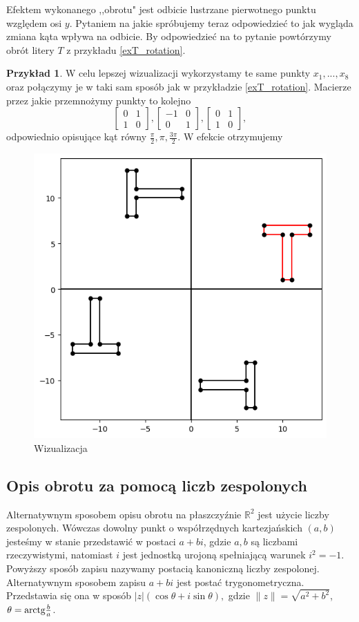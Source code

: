 \documentclass[a4paper,twoside,11pt,reqno]{mwrep}
\theoremstyle{plain} \newtheorem{twr}{Twierdzenie}
\theoremstyle{plain} \newtheorem{lem}{Lemat}
\theoremstyle{definition} \newtheorem{defi}{Definicja}
\theoremstyle{remark} \newtheorem*{wni}{Wniosek}
\theoremstyle{definition} \newtheorem{uwaga}{Uwaga}
\theoremstyle{definition}\newtheorem{prz}{Przykład}
\begin{document}
Efektem wykonanego ,,obrotu" jest odbicie lustrzane pierwotnego punktu względem osi $y$.
Pytaniem na jakie spróbujemy teraz odpowiedzieć to jak wygląda zmiana kąta wpływa na odbicie. 
By odpowiedzieć na to pytanie powtórzymy obrót litery $T$ z przykładu \ref{exT_rotation}.
\begin{prz}
W celu lepszej wizualizacji wykorzystamy te same punkty $x_1,...,x_8$ oraz połączymy je w taki sam sposób
jak w przykładzie  \ref{exT_rotation}. Macierze przez jakie przemnożymy punkty to kolejno
$$\begin{bmatrix}
0&1 \\
1&0 
\end{bmatrix},
\begin{bmatrix}
-1&0 \\
0&1 
\end{bmatrix},
\begin{bmatrix}
0&1 \\
1&0 
\end{bmatrix},
$$
odpowiednio opisujące kąt równy $\frac{\pi}{2},\pi,\frac{3\pi}{2}.$ W efekcie otrzymujemy  
\begin{figure}[h]
\begin{center}
\includegraphics[width=5 cm]{T_obroty.png}
\caption{Wizualizacja }
\end{center}
\end{figure}

\end{prz}
\subsection{Opis obrotu za pomocą liczb zespolonych}
Alternatywnym sposobem opisu obrotu na płaszczyźnie $\mathbb{R}^2$
jest użycie liczby zespolonych. Wówczas dowolny punkt o współrzędnych kartezjańskich $(a,b)$
jesteśmy w stanie przedstawić w postaci $a+bi$, gdzie $a,b$ są liczbami rzeczywistymi, natomiast 
$i$ jest jednostką urojoną spełniającą warunek $i^2 = -1$. Powyższy sposób zapisu nazywamy 
postacią kanoniczną liczby zespolonej.\\
Alternatywnym sposobem zapisu $a+bi$ jest postać trygonometryczna. Przedstawia się ona w sposób
$|z|(\cos\theta+i\sin\theta),$
gdzie $\|z\| =\sqrt{a^2+b^2}$, $\theta=\textup{arctg}\frac{b}{a}$.\\
\end{document}
